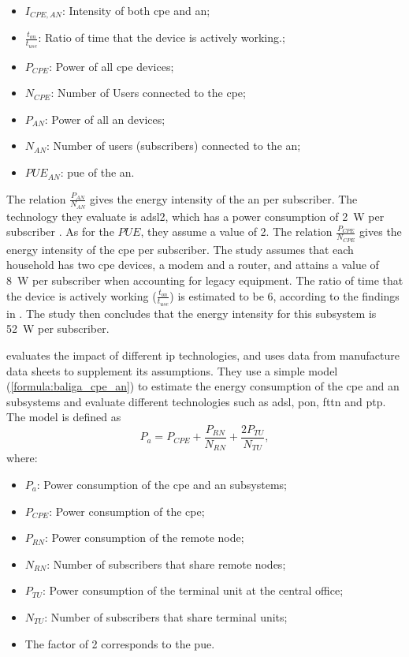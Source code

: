 \begin{itemize}
    \item $I_{CPE,AN}$: Intensity of both \ac{cpe} and \ac{an};
    \item $\frac{t_{on}}{t_{use}}$: Ratio of time that the device is actively working.;
    \item $P_{CPE}$: Power of all \ac{cpe} devices;
    \item $N_{CPE}$: Number of Users connected to the \ac{cpe};
    \item $P_{AN}$: Power of all \ac{an} devices;
    \item $N_{AN}$: Number of users (subscribers) connected to the \ac{an};
    \item $PUE_{AN}$: \ac{pue} of the \ac{an}.
\end{itemize}

The relation $\frac{P_{AN}}{N_{AN}}$ gives the energy intensity of the \ac{an} per subscriber. The technology they evaluate is \ac{adsl}2, which has a power consumption of \SI{2}{\watt} per subscriber \cite{Schien2013}. As for the $PUE$, they assume a value of 2. 
The relation $\frac{P_{CPE}}{N_{CPE}}$ gives the energy intensity of the \ac{cpe} per subscriber. The study assumes that each household has two \ac{cpe} devices, a modem and a router, and attains a value of \SI{8}{\watt} per subscriber when accounting for legacy equipment. 
The ratio of time that the device is actively working ($\frac{t_{on}}{t_{use}}$) is estimated to be 6, according to the findings in \citet{Ciaglia2007}.
The study then concludes that the energy intensity for this subsystem is \SI{52}{\watt} per subscriber.


\citet{Baliga2009} evaluates the impact of different \ac{ip} technologies, and uses data from manufacture data sheets to supplement its assumptions. They use a simple model (\ref{formula:baliga_cpe_an}) to estimate the energy consumption of the \ac{cpe} and \ac{an} subsystems and evaluate different technologies such as \ac{adsl}, \ac{pon}, \ac{fttn} and \ac{ptp}. The model is defined as 
%
\begin{equation}
\label{formula:baliga_cpe_an}
    P_a = P_{CPE} + \frac{P_{RN}}{N_{RN}} + \frac{2P_{TU}}{N_{TU}},
\end{equation}
%
where:
\begin{itemize}
    \item $P_a$: Power consumption of the \ac{cpe} and \ac{an} subsystems;
    \item $P_{CPE}$: Power consumption of the \ac{cpe};
    \item $P_{RN}$: Power consumption of the remote node;
    \item $N_{RN}$: Number of subscribers that share remote nodes;
    \item $P_{TU}$: Power consumption of the terminal unit at the central office;
    \item $N_{TU}$: Number of subscribers that share  terminal units;
    \item The factor of 2 corresponds to the \ac{pue}.  
\end{itemize}

